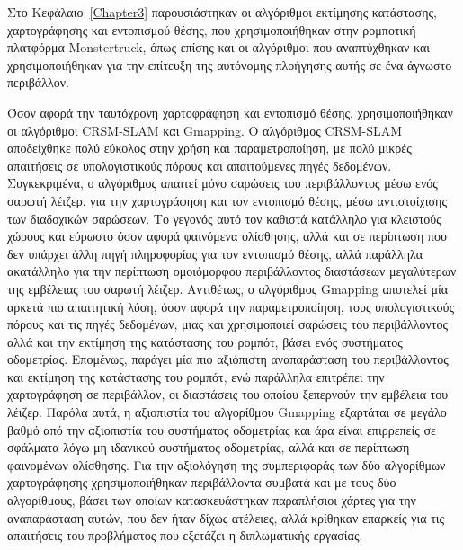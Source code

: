 \bigskip
Στο Κεφάλαιο~\ref{Chapter3} παρουσιάστηκαν οι αλγόριθμοι εκτίμησης κατάστασης, χαρτογράφησης και εντοπισμού θέσης, που χρησιμοποιήθηκαν στην ρομποτική πλατφόρμα Monstertruck, όπως επίσης και οι αλγόριθμοι που αναπτύχθηκαν και χρησιμοποιήθηκαν για την επίτευξη της αυτόνομης πλοήγησης αυτής σε ένα άγνωστο περιβάλλον.

\bigskip
Όσον αφορά την ταυτόχρονη χαρτοφράφηση και εντοπισμό θέσης, χρησιμοποιήθηκαν οι αλγόριθμοι CRSM-SLAM και Gmapping. Ο αλγόριθμος CRSM-SLAM αποδείχθηκε πολύ εύκολος στην χρήση και παραμετροποίηση, με πολύ μικρές απαιτήσεις σε υπολογιστικούς πόρους και απαιτούμενες πηγές δεδομένων. Συγκεκριμένα, ο αλγόριθμος απαιτεί μόνο σαρώσεις του περιβάλλοντος μέσω ενός σαρωτή λέιζερ, για την χαρτογράφηση και τον εντοπισμό θέσης, μέσω αντιστοίχισης των διαδοχικών σαρώσεων. Το γεγονός αυτό τον καθιστά κατάλληλο για κλειστούς χώρους και εύρωστο όσον αφορά φαινόμενα ολίσθησης, αλλά και σε περίπτωση που δεν υπάρχει άλλη πηγή πληροφορίας για τον εντοπισμό θέσης, αλλά παράλληλα ακατάλληλο για την περίπτωση ομοιόμορφου περιβάλλοντος διαστάσεων μεγαλύτερων της εμβέλειας του σαρωτή λέιζερ. Αντιθέτως, ο αλγόριθμος Gmapping αποτελεί μία αρκετά πιο απαιτητική λύση, όσον αφορά την παραμετροποίηση, τους υπολογιστικούς πόρους και τις πηγές δεδομένων, μιας και χρησιμοποιεί σαρώσεις του περιβάλλοντος αλλά και την εκτίμηση της κατάστασης του ρομπότ, βάσει ενός συστήματος οδομετρίας. Επομένως, παράγει μία πιο αξιόπιστη αναπαράσταση του περιβάλλοντος και εκτίμηση της κατάστασης του ρομπότ, ενώ παράλληλα επιτρέπει την χαρτογράφηση σε περιβάλλον, οι διαστάσεις του οποίου ξεπερνούν την εμβέλεια του λέιζερ. Παρόλα αυτά, η αξιοπιστία του αλγορίθμου Gmapping εξαρτάται σε μεγάλο βαθμό από την αξιοπιστία του συστήματος οδομετρίας και άρα είναι επιρρεπείς σε σφάλματα λόγω μη ιδανικού συστήματος οδομετρίας, αλλά και σε περίπτωση φαινομένων ολίσθησης. Για την αξιολόγηση της συμπεριφοράς των δύο αλγορίθμων χαρτογράφησης χρησιμοποιήθηκαν περιβάλλοντα συμβατά και με τους δύο αλγορίθμους, βάσει των οποίων κατασκευάστηκαν παραπλήσιοι χάρτες για την αναπαράσταση αυτών, που δεν ήταν δίχως ατέλειες, αλλά κρίθηκαν επαρκείς για τις απαιτήσεις του προβλήματος που εξετάζει η διπλωματικής εργασίας.

